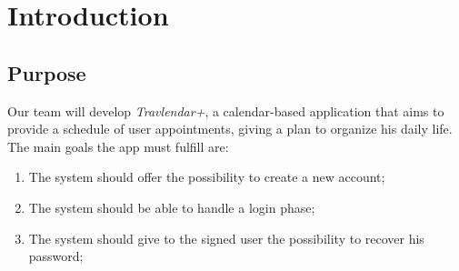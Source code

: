 \chapter{Introduction}

\section{Purpose}

Our team will develop \textit{Travlendar+}, a calendar-based application that aims to provide a schedule of user appointments, giving a plan to organize his daily life.
The main goals the app must fulfill are:

\begin{enumerate}
\renewcommand\labelenumi{\textbf{G\theenumi}}

\item The system should offer the possibility to create a new account;
\label{goal:G1}

\item The system should be able to handle a login phase;
\label{goal:G2}

\item The system should give to the signed user the possibility to recover his password;
\label{goal:G3}


\end{enumerate}
